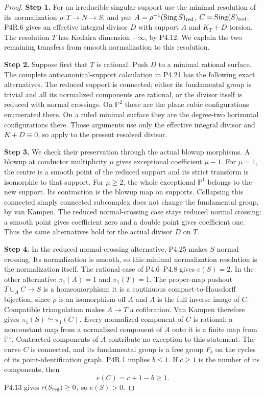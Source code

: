 \begin{proof}
\noindent\textbf{Step 1.} For an irreducible singular support use the
minimal resolution of its normalization
$\rho:T\to N\to S$, and put
$A=\rho^{-1}(\operatorname{Sing}S)_{\rm red}$,
$C=\operatorname{Sing}(S)_{\rm red}$.
P4R.6 gives an effective integral divisor
$D$ with support $A$ and $K_T+D$ torsion.
The resolution $T$ has Kodaira dimension
$-\infty$, by P4.12. We explain the two
remaining transfers from smooth
normalization to this resolution.

\noindent\textbf{Step 2.} Suppose first that $T$ is rational.
Push $D$ to a minimal rational surface.
The complete anticanonical-support calculation
in P4.21 has the following exact alternatives.
The reduced support is connected; either
its fundamental group is trivial and all
its normalized components are rational,
or the divisor itself is reduced with
normal crossings. On $\mathbb P^2$ these
are the plane cubic configurations
enumerated there. On a ruled minimal
surface they are the degree-two horizontal
configurations there. Those arguments use
only the effective integral divisor and
$K+D\equiv0$, so apply to the present
resolved divisor.

\noindent\textbf{Step 3.} We check their preservation through the
actual blowup morphisms. A blowup at
conductor multiplicity $\mu$ gives
exceptional coefficient $\mu-1$.
For $\mu=1$, the centre is a smooth
point of the reduced support and its
strict transform is isomorphic to that
support. For $\mu\ge2$, the whole
exceptional $\mathbb P^1$ belongs to
the new support. Its contraction is
the blowup map on supports. Collapsing
this connected simply connected
subcomplex does not change the
fundamental group, by van Kampen.
The reduced normal-crossing case stays
reduced normal crossing: a smooth
point gives coefficient zero and a
double point gives coefficient one.
Thus the same alternatives hold for
the actual divisor $D$ on $T$.

\noindent\textbf{Step 4.} In the reduced normal-crossing alternative,
P4.25 makes $S$ normal crossing. Its
normalization is smooth, so this minimal
normalization resolution is the
normalization itself. The rational case
of P4.6--P4.8 gives $e(S)=2$.
In the other alternative $\pi_1(A)=1$
and $\pi_1(T)=1$. The proper-map pushout
$T\cup_A C\to S$ is a homeomorphism:
it is a continuous compact-to-Hausdorff
bijection, since $\rho$ is an isomorphism
off $A$ and $A$ is the full inverse
image of $C$. Compatible triangulation
makes $A\to T$ a cofibration.
Van Kampen therefore gives
$\pi_1(S)\simeq\pi_1(C)$.
Every normalized component of $C$ is
rational: a nonconstant map from a
normalized component of $A$ onto it
is a finite map from $\mathbb P^1$.
Contracted components of $A$ contribute
no exception to this statement.
The curve $C$ is connected, and its
fundamental group is a free group
$F_b$ on the cycles of its
point-identification graph. P4R.1
implies $b\le1$. If $c\ge1$ is the
number of its components, then
\[
 e(C)=c+1-b\ge1.
\]
P4.13 gives $e(S_{\rm reg})\ge0$,
so $e(S)>0$.


\end{proof}
